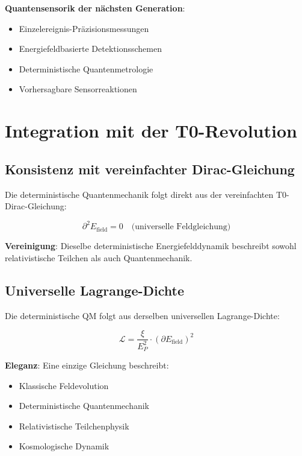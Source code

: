 \documentclass[12pt,a4paper]{article}
\newcommand{\xipar}{\xi}
\newcommand{\EPlanck}{E_P}
\theoremstyle{definition}
\theoremstyle{remark}
\begin{document}
\textbf{Quantensensorik der n{\"a}chsten Generation}:
\begin{itemize}
	\item Einzelereignis-Pr{\"a}zisionsmessungen
	\item Energiefeldbasierte Detektionsschemen
	\item Deterministische Quantenmetrologie
	\item Vorhersagbare Sensorreaktionen
\end{itemize}

\section{Integration mit der T0-Revolution}

\subsection{Konsistenz mit vereinfachter Dirac-Gleichung}

Die deterministische Quantenmechanik folgt direkt aus der vereinfachten T0-Dirac-Gleichung:

\begin{equation}
	\partial^2 E_{\text{field}} = 0 \quad \text{(universelle Feldgleichung)}
\end{equation}

\textbf{Vereinigung}: Dieselbe deterministische Energiefelddynamik beschreibt sowohl relativistische Teilchen als auch Quantenmechanik.

\subsection{Universelle Lagrange-Dichte}

Die deterministische QM folgt aus derselben universellen Lagrange-Dichte:

\begin{equation}
	\mathcal{L} = \frac{\xipar}{\EPlanck^2} \cdot (\partial E_{\text{field}})^2
\end{equation}

\textbf{Eleganz}: Eine einzige Gleichung beschreibt:
\begin{itemize}
	\item Klassische Feldevolution
	\item Deterministische Quantenmechanik
	\item Relativistische Teilchenphysik
	\item Kosmologische Dynamik
\end{itemize}
\end{document}
